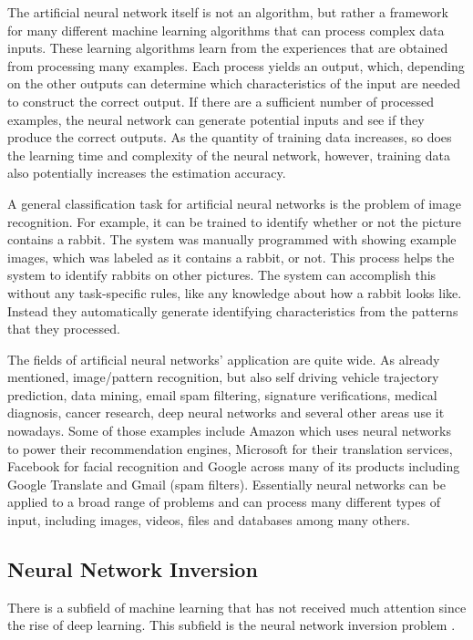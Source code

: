 The artificial neural network itself is not an algorithm, but rather a framework for many different machine learning algorithms that can process complex data inputs. These learning algorithms learn from the experiences that are obtained from processing many examples. Each process yields an output, which, depending on the other outputs can determine which characteristics of the input are needed to construct the correct output. If there are a sufficient number of processed examples, the neural network can generate potential inputs and see if they produce the correct outputs. As the quantity of training data increases, so does the learning time and complexity of the neural network, however, training data also potentially increases the estimation accuracy. \medskip

A general classification task for artificial neural networks is the problem of image recognition. For example, it can be trained to identify whether or not the picture contains a rabbit. The system was manually programmed with showing example images, which was labeled as it contains a rabbit, or not. This process helps the system to identify rabbits on other pictures. The system can accomplish this without any task-specific rules, like any knowledge about how a rabbit looks like. Instead they automatically generate identifying characteristics from the patterns that they processed.\medskip

The fields of artificial neural networks' application are quite wide. As already mentioned, image/pattern recognition, but also self driving vehicle trajectory prediction, data mining, email spam filtering, signature verifications, medical diagnosis, cancer research, deep neural networks and several other areas use it nowadays. Some of those examples include Amazon which uses neural networks to power their recommendation engines, Microsoft for their translation services, Facebook for facial recognition and Google across many of its products including Google Translate and Gmail (spam filters). Essentially neural networks can be applied to a broad range of problems and can process many different types of input, including images, videos, files and databases among many others. 



\subsection{Neural Network Inversion}

There is a subfield of machine learning that has not received much attention since the rise of deep learning. This subfield is the neural network inversion problem \cite{KINDERMANN1990277}. 

